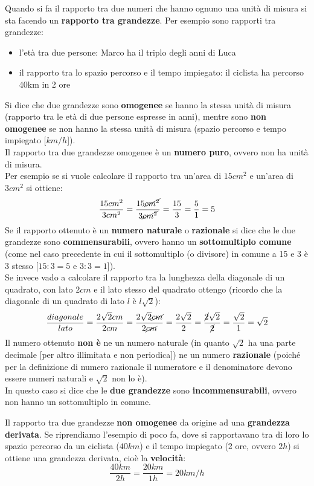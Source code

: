 \documentclass[14pt]{extarticle}
\begin{document}
Quando si fa il rapporto tra due numeri che hanno ognuno una unità di misura si sta facendo un \textbf{rapporto tra grandezze}. Per esempio sono rapporti tra grandezze:
\begin{itemize}
    \item l'età tra due persone: Marco ha il triplo degli anni di Luca
    \item il rapporto tra lo spazio percorso e il tempo impiegato: il ciclista ha percorso 40km in 2 ore
\end{itemize}
Si dice che due grandezze sono \textbf{omogenee} se hanno la stessa unità di misura (rapporto tra le età di due persone espresse in anni), mentre sono \textbf{non omogenee} se non hanno la stessa unità di misura (spazio percorso e tempo impiegato [\(km/h\)]).\\
Il rapporto tra due grandezze omogenee è un \textbf{numero puro}, ovvero non ha unità di misura.\\
Per esempio se si vuole calcolare il rapporto tra un'area di \(15cm^2\) e un'area di \(3cm^2\) si ottiene:
\[\dfrac{15cm^2}{3cm^2}=\dfrac{15\cancel{cm^2}}{3\cancel{cm^2}}=\dfrac{15}{3}=\dfrac{5}{1}=5\]
Se il rapporto ottenuto è un \textbf{numero naturale} o \textbf{razionale} si dice che le due grandezze sono \textbf{commensurabili}, ovvero hanno un \textbf{sottomultiplo comune} (come nel caso precedente in cui il sottomultiplo (o divisore) in comune a 15 e 3 è 3 stesso [\(15:3=5\) e \(3:3=1\)]). \\
Se invece vado a calcolare il rapporto tra la lunghezza della diagonale di un quadrato, con lato \(2cm\) e il lato stesso del quadrato ottengo (ricordo che la diagonale di un quadrato di lato \(l\) è \(l\sqrt{2}\)):
\[\dfrac{diagonale}{lato}=\dfrac{2\sqrt{2}cm}{2cm}=\dfrac{2\sqrt{2}\cancel{cm}}{2\cancel{cm}}=\dfrac{2\sqrt{2}}{2}=\dfrac{\cancel{2}\sqrt{2}}{\cancel2}=\dfrac{\sqrt{2}}{1}=\sqrt{2}\]
Il numero ottenuto \textbf{non è} ne un numero naturale (in quanto \(\sqrt{2}\) ha una parte decimale [per altro illimitata e non periodica]) ne un numero \textbf{razionale} (poiché per la definizione di numero razionale il numeratore e il denominatore devono essere numeri naturali e \(\sqrt{2}\) non lo è). \\
In questo caso si dice che le \textbf{due grandezze} sono \textbf{incommensurabili}, ovvero non hanno un sottomultiplo in comune. 

Il rapporto tra due grandezze \textbf{non omogenee} da origine ad una \textbf{grandezza derivata}. Se riprendiamo l'esempio di poco fa, dove si rapportavano tra di loro lo spazio percorso da un ciclista (\(40km\)) e il tempo impiegato (2 ore, ovvero \(2h\)) si ottiene una grandezza derivata, cioè la \textbf{velocità}:
\[\dfrac{40km}{2h}=\dfrac{20km}{1h}=20km/h\]
\clearpage
\end{document}
